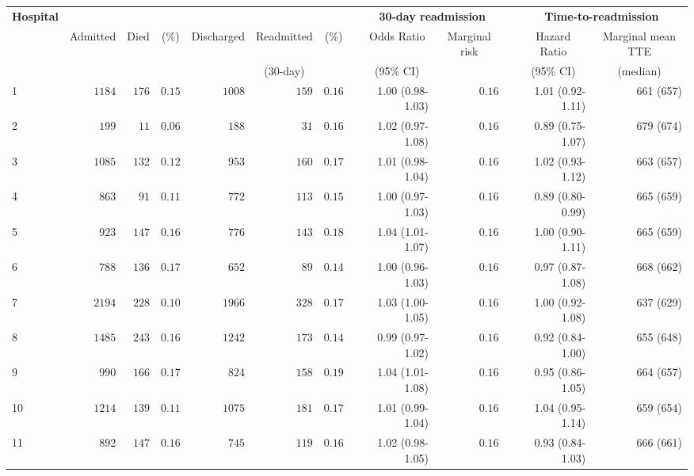 \documentclass[]{article}\usepackage[]{graphicx}\usepackage[]{color}
\begin{document}
\begin{landscape}
\begin{table}[!tbp]
\end{table}
\begin{table}[!tbp]
\begin{center}
\begin{tabular}{lrrrrrrcrrcrr}
\hline\hline
\multicolumn{1}{l}{\bfseries Hospital}&\multicolumn{6}{c}{\bfseries }&\multicolumn{1}{c}{\bfseries }&\multicolumn{2}{c}{\bfseries 30-day readmission}&\multicolumn{1}{c}{\bfseries }&\multicolumn{2}{c}{\bfseries Time-to-readmission}\tabularnewline
\cline{9-10} \cline{12-13}
\multicolumn{1}{l}{}&\multicolumn{1}{c}{Admitted}&\multicolumn{1}{c}{Died}&\multicolumn{1}{c}{(\%)}&\multicolumn{1}{c}{Discharged}&\multicolumn{1}{c}{Readmitted}&\multicolumn{1}{c}{(\%)}&\multicolumn{1}{c}{}&\multicolumn{1}{c}{Odds Ratio}&\multicolumn{1}{c}{Marginal risk}&\multicolumn{1}{c}{}&\multicolumn{1}{c}{Hazard Ratio}&\multicolumn{1}{c}{Marginal mean TTE}\tabularnewline
&&&&&\multicolumn{1}{c}{{\scriptsize (30-day)}}&&&\multicolumn{1}{c}{{\scriptsize (95\% CI)}}&&&\multicolumn{1}{c}{{\scriptsize (95\% CI)}}&\multicolumn{1}{c}{{\scriptsize (median)}}\tabularnewline
\hline
1&$1184$&$176$&$0.15$&$1008$&$159$&$0.16$&&1.00 (0.98-1.03)&$0.16$&&1.01 (0.92-1.11)&661 (657)\tabularnewline
2&$ 199$&$ 11$&$0.06$&$ 188$&$ 31$&$0.16$&&1.02 (0.97-1.08)&$0.16$&&0.89 (0.75-1.07)&679 (674)\tabularnewline
3&$1085$&$132$&$0.12$&$ 953$&$160$&$0.17$&&1.01 (0.98-1.04)&$0.16$&&1.02 (0.93-1.12)&663 (657)\tabularnewline
4&$ 863$&$ 91$&$0.11$&$ 772$&$113$&$0.15$&&1.00 (0.97-1.03)&$0.16$&&0.89 (0.80-0.99)&665 (659)\tabularnewline
5&$ 923$&$147$&$0.16$&$ 776$&$143$&$0.18$&&1.04 (1.01-1.07)&$0.16$&&1.00 (0.90-1.11)&665 (659)\tabularnewline
6&$ 788$&$136$&$0.17$&$ 652$&$ 89$&$0.14$&&1.00 (0.96-1.03)&$0.16$&&0.97 (0.87-1.08)&668 (662)\tabularnewline
7&$2194$&$228$&$0.10$&$1966$&$328$&$0.17$&&1.03 (1.00-1.05)&$0.16$&&1.00 (0.92-1.08)&637 (629)\tabularnewline
8&$1485$&$243$&$0.16$&$1242$&$173$&$0.14$&&0.99 (0.97-1.02)&$0.16$&&0.92 (0.84-1.00)&655 (648)\tabularnewline
9&$ 990$&$166$&$0.17$&$ 824$&$158$&$0.19$&&1.04 (1.01-1.08)&$0.16$&&0.95 (0.86-1.05)&664 (657)\tabularnewline
10&$1214$&$139$&$0.11$&$1075$&$181$&$0.17$&&1.01 (0.99-1.04)&$0.16$&&1.04 (0.95-1.14)&659 (654)\tabularnewline
11&$ 892$&$147$&$0.16$&$ 745$&$119$&$0.16$&&1.02 (0.98-1.05)&$0.16$&&0.93 (0.84-1.03)&666 (661)\tabularnewline

\end{tabular}
\end{center}
\end{table}
\end{landscape}
\end{document}
